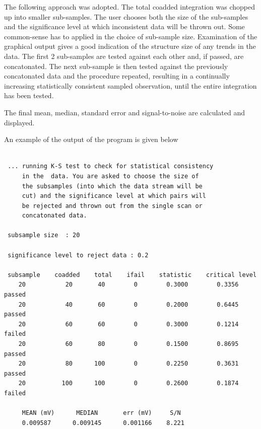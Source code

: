 \documentclass{article}
\begin{document}
The following approach was adopted.
The total coadded integration was chopped up into smaller sub-samples. The user
chooses both the size of the sub-samples and the significance level at which
inconsistent data will be thrown out. Some common-sense has to applied in the
choice of sub-sample size. Examination of the graphical output gives a good
indication of the structure size of any trends in the data.
The first 2 sub-samples are tested against each other and, if passed, are
concatonated. The next sub-sample is then tested against the previously
concatonated data and the procedure repeated, resulting in a continually
increasing statistically consistent sampled observation, until the entire
integration has been tested.

The final mean, median, standard error and signal-to-noise are calculated and
displayed.

An example of the output of the program is given below

\begin{verbatim}

 ... running K-S test to check for statistical consistency
     in the  data. You are asked to choose the size of
     the subsamples (into which the data stream will be
     cut) and the significance level at which pairs will
     be rejected and thrown out from the single scan or
     concatonated data.

 subsample size  : 20

 significance level to reject data : 0.2

 subsample    coadded    total    ifail    statistic    critical level
    20           20       40        0        0.3000        0.3356      passed
    20           40       60        0        0.2000        0.6445      passed
    20           60       60        0        0.3000        0.1214      failed
    20           60       80        0        0.1500        0.8695      passed
    20           80      100        0        0.2250        0.3631      passed
    20          100      100        0        0.2600        0.1874      failed

     MEAN (mV)      MEDIAN       err (mV)     S/N
     0.009587      0.009145      0.001166    8.221

\end{verbatim}
\end{document}
